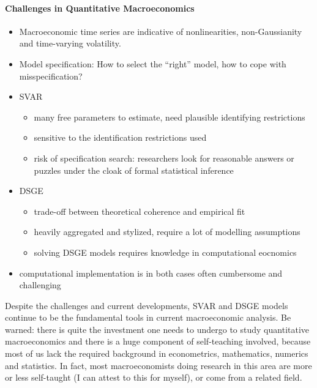 \paragraph*{Challenges in Quantitative Macroeconomics}
\begin{itemize}
  \item Macroeconomic time series are indicative of nonlinearities, non-Gaussianity and time-varying volatility.  
  \item Model specification: How to select the \enquote{right} model, how to cope with misspecification?
  \item SVAR
  \begin{itemize}
    \item many free parameters to estimate, need plausible identifying restrictions
    \item sensitive to the identification restrictions used
    \item risk of specification search: researchers look for reasonable answers or puzzles under the cloak of formal statistical inference
  \end{itemize}  
  \item DSGE
  \begin{itemize}
    \item trade-off between theoretical coherence and empirical fit
    \item heavily aggregated and stylized, require a lot of modelling assumptions
    \item solving DSGE models requires knowledge in computational eocnomics
  \end{itemize} 
  \item computational implementation is in both cases often cumbersome and challenging  
\end{itemize}
Despite the challenges and current developments,
  SVAR and DSGE models continue to be the fundamental tools in current macroeconomic analysis.
Be warned: there is quite the investment one needs to undergo to study quantitative macroeconomics
  and there is a huge component of self-teaching involved,
  because most of us lack the required background in econometrics, mathematics, numerics and statistics.
In fact, most macroeconomists doing research in this area are more or less self-taught (I can attest to this for myself),
  or come from a related field.